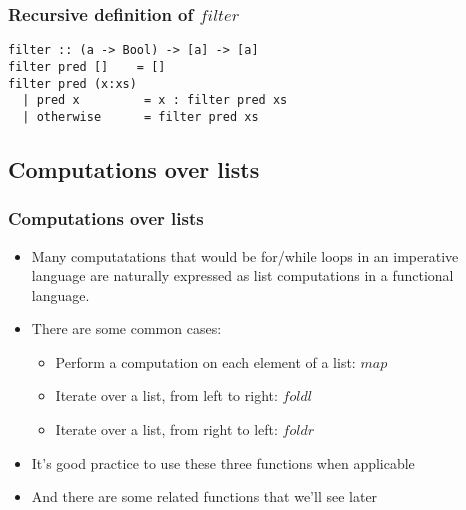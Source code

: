 \documentclass{beamer}
\begin{document}
\begin{frame}[fragile]
\frametitle{Recursive definition of $filter$}

\begin{verbatim}
filter :: (a -> Bool) -> [a] -> [a]
filter pred []    = []
filter pred (x:xs)
  | pred x         = x : filter pred xs
  | otherwise      = filter pred xs
\end{verbatim}

\end{frame}

\subsection{Computations over lists}
\begin{frame}[fragile]
\frametitle{Computations over lists}

\begin{itemize}
\item Many computatations that would be for/while loops in an
  imperative language are naturally expressed as list computations
  in a functional language.
\item There are some common cases:
  \begin{itemize}
  \item Perform a computation on each element of a list: $map$
  \item Iterate over a list, from left to right: $foldl$
  \item Iterate over a list, from right to left: $foldr$
  \end{itemize}
\item It's good practice to use these three functions when
  applicable
\item And there are some related functions that we'll see later
\end{itemize}

\end{frame}
\end{document}
